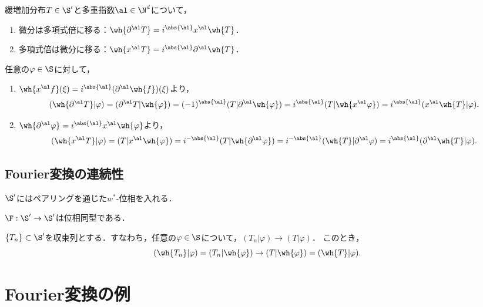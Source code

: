 \documentclass[uplatex,dvipdfmx]{jsreport}
\begin{document}
\begin{proposition}
    緩増加分布$T\in\S'$と多重指数$\al\in\N^d$について，
    \begin{enumerate}
        \item 微分は多項式倍に移る：$\wh{\partial^\al T}=i^{\abs{\al}}x^\al\wh{T}$．
        \item 多項式倍は微分に移る：$\wh{x^\al T}=i^{\abs{\al}}\partial^\al\wh{T}$．
    \end{enumerate}
\end{proposition}
\begin{Proof}
    任意の$\varphi\in\S$に対して，
    \begin{enumerate}
        \item $\wh{x^\al f}(\xi)=i^{\abs{\al}}(\partial^\al\wh{f})(\xi)$より，
        \[(\wh{\partial^\al T}|\varphi)=(\partial^\al T|\wh{\varphi})=(-1)^{\abs{\al}}(T|\partial^\al\wh{\varphi})=i^{\abs{\al}}(T|\wh{x^\al\varphi})=i^{\abs{\al}}(x^\al\wh{T}|\varphi).\]
        \item $\wh{\partial^\al\varphi}=i^{\abs{\al}}x^\al\wh{\varphi}$より，
        \[(\wh{x^\al T}|\varphi)=(T|x^\al\wh{\varphi})=i^{-\abs{\al}}(T|\wh{\partial^\al\varphi})=i^{-\abs{\al}}(\wh{T}|\partial^\al\varphi)=i^{\abs{\al}}(\partial^\al\wh{T}|\varphi).\]
    \end{enumerate}
\end{Proof}

\subsection{Fourier変換の連続性}

\begin{tcolorbox}[colframe=ForestGreen, colback=ForestGreen!10!white,breakable,colbacktitle=ForestGreen!40!white,coltitle=black,fonttitle=\bfseries\sffamily,
title=]
    $\S'$にはペアリングを通じた$w^*$-位相を入れる．
\end{tcolorbox}

\begin{proposition}
    $\F:\S'\to\S'$は位相同型である．
\end{proposition}
\begin{Proof}
    $\{T_n\}\subset\S'$を収束列とする．すなわち，任意の$\varphi\in\S$について，$(T_n|\varphi)\to(T|\varphi)$．
    このとき，
    \[(\wh{T_n}|\varphi)=(T_n|\wh{\varphi})\to(T|\wh{\varphi})=(\wh{T}|\varphi).\]
\end{Proof}

\section{Fourier変換の例}
\end{document}
